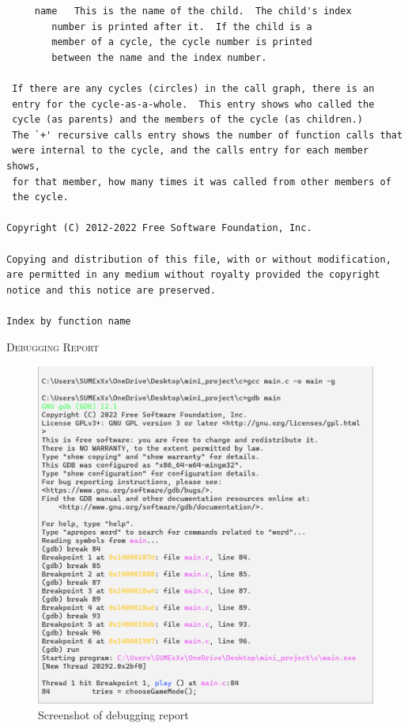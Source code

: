 \documentclass{report}
\begin{document}
\begin{verbatim}
     name	This is the name of the child.  The child's index
		number is printed after it.  If the child is a
		member of a cycle, the cycle number is printed
		between the name and the index number.

 If there are any cycles (circles) in the call graph, there is an
 entry for the cycle-as-a-whole.  This entry shows who called the
 cycle (as parents) and the members of the cycle (as children.)
 The `+' recursive calls entry shows the number of function calls that
 were internal to the cycle, and the calls entry for each member shows,
 for that member, how many times it was called from other members of
 the cycle.

Copyright (C) 2012-2022 Free Software Foundation, Inc.

Copying and distribution of this file, with or without modification,
are permitted in any medium without royalty provided the copyright
notice and this notice are preserved.

Index by function name

\end{verbatim}

\break

\hfill

\begin{center}
	\textsc{\LARGE{Debugging Report}}
\end{center}

\hfill

\begin{figure}[H]
  \includegraphics[width=\linewidth]{pic1.png}
  \caption{Screenshot of debugging report}
  \label{Debug picture 1}
\end{figure}
\end{document}
